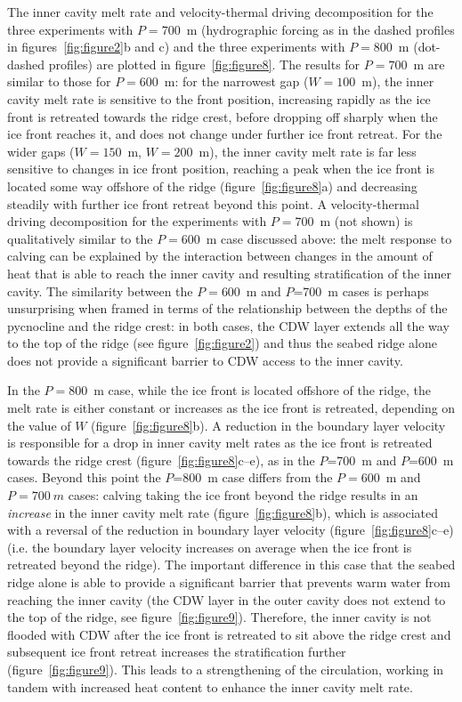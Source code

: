 \documentclass[draft]{agujournal2019}
\begin{document}
The inner cavity melt rate and velocity-thermal driving decomposition for the three experiments with $P=700$~m (hydrographic forcing as in the dashed profiles in figures~\ref{fig:figure2}b and c) and the three experiments with $P=800$~m (dot-dashed profiles) are plotted in figure~\ref{fig:figure8}. The results for $P=700$~m are similar to those for $P=600$~m: for the narrowest gap ($W=100$~m), the inner cavity melt rate is sensitive to the front position, increasing rapidly as the ice front is retreated towards the ridge crest, before dropping off sharply when the ice front reaches it, and does not change under further ice front retreat. For the wider gaps ($W=150$~m, $W=200$~m), the inner cavity melt rate is far less sensitive to changes in ice front position, reaching a peak when the ice front is located some way offshore of the ridge (figure~\ref{fig:figure8}a) and decreasing steadily with further ice front retreat beyond this point. A velocity-thermal driving decomposition for the experiments with $P=700$~m (not shown) is qualitatively similar to the $P=600$~m case discussed above: the melt response to calving can be explained by the interaction between changes in the amount of heat that is able to reach the inner cavity and resulting stratification of the inner cavity. The similarity between the $P=600$~m and $P$=700~m cases is perhaps unsurprising when framed in terms of the relationship between the depths of the pycnocline and the ridge crest: in both cases, the CDW layer extends all the way to the top of the ridge (see figure~\ref{fig:figure2}) and thus the seabed ridge alone does not provide a significant barrier to CDW access to the inner cavity.

In the $P=800$~m case, while the ice front is located offshore of the ridge, the melt rate is either constant or increases as the ice front is retreated, depending on the value of $W$ (figure~\ref{fig:figure8}b). A reduction in the boundary layer velocity is responsible for a drop in inner cavity melt rates as the ice front is retreated towards the ridge crest (figure~\ref{fig:figure8}c--e), as in the $P$=700~m and $P$=600~m cases. Beyond this point the $P$=800~m case differs from the $P = 600$~m and $P = 700~m$ cases: calving taking the ice front beyond the ridge results in an \emph{increase} in the inner cavity melt rate (figure~\ref{fig:figure8}b), which is associated with a reversal of the reduction in boundary layer velocity (figure~\ref{fig:figure8}c--e) (i.e. the boundary layer velocity increases on average when the ice front is retreated beyond the ridge). The important difference in this case that the seabed ridge alone is able to provide a significant barrier that prevents warm water from reaching the inner cavity (the CDW layer in the outer cavity does not extend to the top of the ridge, see figure~\ref{fig:figure9}). Therefore, the inner cavity is not flooded with CDW after the ice front is retreated to sit above the ridge crest and subsequent ice front retreat increases the stratification further (figure~\ref{fig:figure9}). This leads to a strengthening of the circulation, working in tandem with increased heat content to enhance the inner cavity melt rate.
\end{document}
